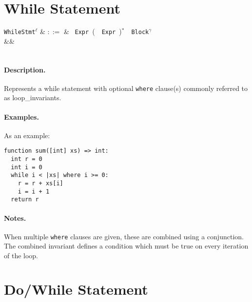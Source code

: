 
\section{While Statement}

\begin{syntax}
  \verb+WhileStmt+$^\ell$ & $::=$ & \ \verb+Expr+\ \big(\
  \ \verb+Expr+\ \big)$^*$\ \token{:}\ \verb+Block+$^\gamma$\ \\
&&\\
\\
\end{syntax}

\paragraph{Description.} Represents a while statement with optional
\lstinline{where} clause(s) commonly referred to as \gls{loop_invariant}s.

\paragraph{Examples.} As an example:

\begin{lstlisting}
function sum([int] xs) => int:
  int r = 0
  int i = 0
  while i < |xs| where i >= 0:
    r = r + xs[i]
    i = i + 1
  return r
\end{lstlisting}

\paragraph{Notes.}   When multiple \lstinline{where} clauses are
given, these are combined using a conjunction. The combined invariant
defines a condition which must be true on every iteration of the loop.


\section{Do/While Statement}

